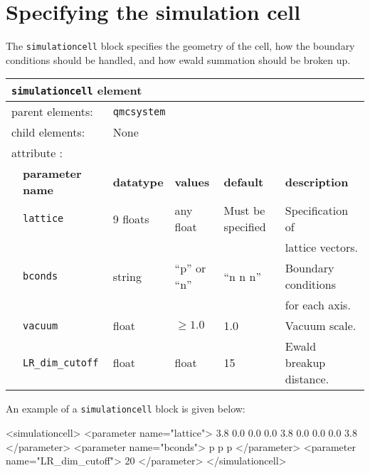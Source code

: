 \section{Specifying the simulation cell}
\label{chap:simulationcell}

The \texttt{simulationcell} block specifies the geometry of the cell, how the boundary conditions should be handled, and how ewald summation should be broken up.

\begin{table}[h]
\begin{center}
\begin{tabularx}{\textwidth}{l l l l l l }
\hline
\multicolumn{6}{l}{\texttt{simulationcell} element} \\
\hline
\multicolumn{2}{l}{parent elements:} & \multicolumn{4}{l}{\texttt{qmcsystem}}\\
\multicolumn{2}{l}{child  elements:} & \multicolumn{4}{l}{None}\\
\multicolumn{2}{l}{attribute      :} & \multicolumn{4}{l}{}\\
   &   \bfseries parameter name            & \bfseries datatype & \bfseries values & \bfseries default   & \bfseries description \\
\hline
   &   \texttt{lattice}  & 9 floats & any float & Must be specified & Specification of \\
   &                     &        &             &                   & lattice vectors. \\
   &   \texttt{bconds}   & string & ``p'' or ``n''  & ``n n n'' & Boundary conditions \\
   &                     &        &             &           & for each axis. \\
   &   \texttt{vacuum} & float & $\ge 1.0$ & 1.0        & Vacuum scale. \\
   &   \texttt{LR\_dim\_cutoff} & float & float & 15        & Ewald breakup distance. \\
\hline
\end{tabularx}
\end{center}
\end{table}

An example of a \texttt{simulationcell} block is given below:
\begin{shade}
  <simulationcell>
    <parameter name="lattice">
      3.8       0.0       0.0
      0.0       3.8       0.0
      0.0       0.0       3.8
    </parameter>
    <parameter name="bconds">
       p p p
    </parameter>
    <parameter name="LR_dim_cutoff"> 20 </parameter>
  </simulationcell>
\end{shade}

